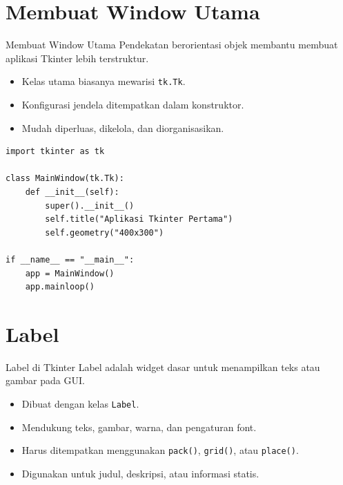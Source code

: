 \documentclass[aspectratio=169, table]{beamer}
\begin{document}
\section{Membuat Window Utama}
\begin{frame}[fragile]{Membuat Window Utama}
\vspace{20pt}
Pendekatan berorientasi objek membantu membuat aplikasi Tkinter lebih terstruktur.

\begin{itemize}
    \item Kelas utama biasanya mewarisi \texttt{tk.Tk}.
    \item Konfigurasi jendela ditempatkan dalam konstruktor.
    \item Mudah diperluas, dikelola, dan diorganisasikan.
\end{itemize}

\begin{lstlisting}[style=PythonStyle]
import tkinter as tk

class MainWindow(tk.Tk):
    def __init__(self):
        super().__init__()
        self.title("Aplikasi Tkinter Pertama")
        self.geometry("400x300")

if __name__ == "__main__":
    app = MainWindow()
    app.mainloop()
\end{lstlisting}
\end{frame}



\section{Label}

\begin{frame}[fragile]{Label di Tkinter}
\vspace{20pt}
Label adalah widget dasar untuk menampilkan teks atau gambar pada GUI.

\begin{itemize}
    \item Dibuat dengan kelas \texttt{Label}.
    \item Mendukung teks, gambar, warna, dan pengaturan font.
    \item Harus ditempatkan menggunakan \texttt{pack()}, \texttt{grid()}, atau \texttt{place()}.
    \item Digunakan untuk judul, deskripsi, atau informasi statis.
\end{itemize}
\end{frame}
\end{document}
